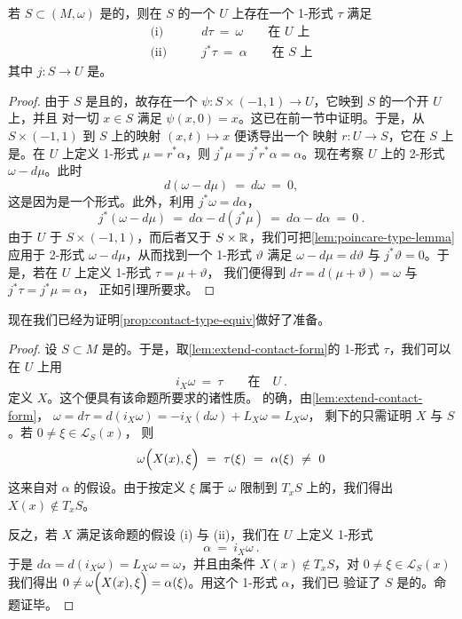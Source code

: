 \begin{lemma}\label{lem:extend-contact-form}
若 $S\subset(M,\omega)$ 是\trContactType{}的，则在 $S$ 的一个\trNeighborhood{}%
$U$ 上存在一个 1-形式 $\tau$ 满足
\begin{align*}
\text{(i)}\qquad & d\tau\ =\ \omega\qquad\text{在 $U$ 上}\\
\text{(ii)}\qquad & j^{*}\tau\ =\ \alpha\qquad\text{在 $S$ 上}
\end{align*}
其中 $j:S\to U$ 是\trInclusionMapping。
\end{lemma}
\begin{proof}
由于 $S$ 是\trCompact{}且\trOrientable{}的，故存在一个\trDiffeomorphism{}%
$\psi:S\times(-1,1)\to U$，它映到 $S$ 的一个开\trNeighborhood{} $U$ 上，并且%
对一切 $x\in S$ 满足 $\psi(x,0)=x$。这已在前一节中证明。于是，从%
$S\times(-1,1)$ 到 $S$ 上的\trProjection{}映射 $(x,t)\mapsto x$ 便诱导出一个%
\trSmooth{}映射 $r:U\to S$，它在 $S$ 上是\trIdentityMap。在 $U$ 上定义%
1-形式 $\mu=r^{*}\alpha$，则 $j^{*}\mu=j^{*}r^{*}\alpha=\alpha$。现在考察%
$U$ 上的 2-形式 $\omega-d\mu$。此时
\[
d(\omega-d\mu)\ =\ d\omega\ =\ 0,
\]
这是因为\trSymplecticStructure{}是一个\trClosed{}形式。此外，利用%
$j^{*}\omega=d\alpha$，
\[
j^{*}(\omega-d\mu)\ =\ d\alpha-d(j^{*}\mu)\ =\ d\alpha-d\alpha\ =\ 0\ .
\]
由于 $U$ \trDiffeomorphic{}于 $S\times(-1,1)$，而后者又\trIsomorphic{}于%
\trBundle{} $S\times\mathbb{R}$，我们可把\cref{lem:poincare-type-lemma}应用于 2-形式%
$\omega-d\mu$，从而找到一个 1-形式 $\vartheta$ 满足 $\omega-d\mu=d\vartheta$%
与 $j^{*}\vartheta=0$。于是，若在 $U$ 上定义 1-形式 $\tau=\mu+\vartheta$，%
我们便得到 $d\tau=d(\mu+\vartheta)=\omega$ 与 $j^{*}\tau=j^{*}\mu=\alpha$，%
正如引理所要求。
\end{proof}

现在我们已经为证明\cref{prop:contact-type-equiv}做好了准备。

\begin{proof}
设 $S\subset M$ 是\trContactType{}的。于是，取\cref{lem:extend-contact-form}的%
1-形式 $\tau$，我们可以在 $U$ 上用
\[
i_{X}\omega\ =\ \tau\qquad\text{在}\quad U\ .
\]
定义\trVectorField{} $X$。这个\trVectorField{}便具有该命题所要求的诸性质。%
的确，由\cref{lem:extend-contact-form}，%
$\omega=d\tau=d(i_{X}\omega)=-i_{X}(d\omega)+L_{X}\omega=L_{X}\omega$，%
剩下的只需证明 $X$ 与 $S$ \trTransversal。若 $0\neq\xi\in\mathcal{L}_{S}(x)$，%
则
\[
\omega\Bigl(X(x),\xi\Bigr)\ =\ \tau(\xi)\ =\ \alpha(\xi)\ \neq\ 0
\]
这来自对 $\alpha$ 的假设。由于按定义 $\xi$ 属于 $\omega$ 限制到%
\trTangentSpace{} $T_{x}S$ 上的\trKernel，我们得出 $X(x)\notin T_{x}S$。

反之，若\trVectorField{} $X$ 满足该命题的假设 (i) 与 (ii)，我们在 $U$ 上定义%
1-形式
\[
\alpha\ =\ i_{X}\omega\ .
\]
于是 $d\alpha=d(i_{X}\omega)=L_{X}\omega=\omega$，并且由\trTransversal{}条件%
$X(x)\notin T_{x}S$，对 $0\neq\xi\in\mathcal{L}_{S}(x)$ 我们得出%
$0\neq\omega\Bigl(X(x),\xi\Bigr)=\alpha(\xi)$。用这个 1-形式 $\alpha$，我们已%
验证了 $S$ 是\trContactType{}的。命题证毕。
\end{proof}

